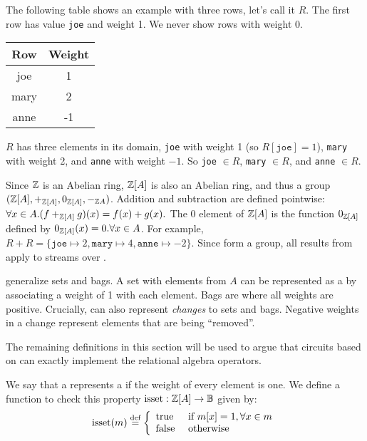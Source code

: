 The following table shows an example \zr with three rows, let's call
it $R$.  The first row has value \texttt{joe} and weight 1.  We never
show rows with weight 0.
%
\begin{center}
\begin{tabular}{|c|c|}\hline
  Row & Weight \\ \hline
  joe & 1 \\
  mary & 2 \\
  anne & -1 \\ \hline
\end{tabular}
\end{center}

$R$ has three elements in its domain, \texttt{joe} with weight 1 (so
$R[\texttt{joe}] = 1$), \texttt{mary} with weight 2, and \texttt{anne}
with weight $-1$.  So \texttt{joe} $\in R$, \texttt{mary} $\in R$,
and \texttt{anne} $\in R$.

Since $\mathbb{Z}$ is an Abelian ring, $\mathbb{Z}[A]$ is also an Abelian ring, and
thus a group $(\mathbb{Z}[A], +_{\mathbb{Z}[A]}, 0_{\mathbb{Z}[A]}, -_{\mathbb{Z}{A}})$.  Addition and
subtraction are defined pointwise: $\forall x \in A . \\ (f +_{\mathbb{Z}[A]}
g)(x) = f(x) + g(x) .$ The $0$ element of $\mathbb{Z}[A]$ is the function
$0_{\mathbb{Z}[A]}$ defined by $0_{\mathbb{Z}[A]}(x) = 0 .  \forall x \in A$.  For
example, $R + R = \{ \texttt{joe} \mapsto 2, \texttt{mary} \mapsto 4,
\texttt{anne} \mapsto -2 \}$.  Since \zrs form a group, all results
from  apply to streams over \zrs.

\zrs generalize sets and bags.  A set with elements from $A$ can be
represented as a \zr by associating a weight of 1 with each element.
Bags are \zrs where all weights are positive.  Crucially, \zrs can
also represent \emph{changes} to sets and bags.  Negative weights in a
change represent elements that are being ``removed''.

The remaining definitions in this section will be used to argue that
circuits based on \zrs can exactly implement the relational algebra
operators.

\begin{definition}
We say that a \zr represents a  if the weight of every
element is one.  We define a function to check this property
$\mbox{isset} : \mathbb{Z}[A] \rightarrow \mathbb{B}$
given by:
$$\mbox{isset}(m) \stackrel{\textrm{\scriptsize def}}{=} \left\{
\begin{array}{ll}
  \mbox{true} & \mbox{ if } m[x] = 1, \forall x \in m \\
  \mbox{false} & \mbox{ otherwise}
\end{array}
\right.
$$
\end{definition}

